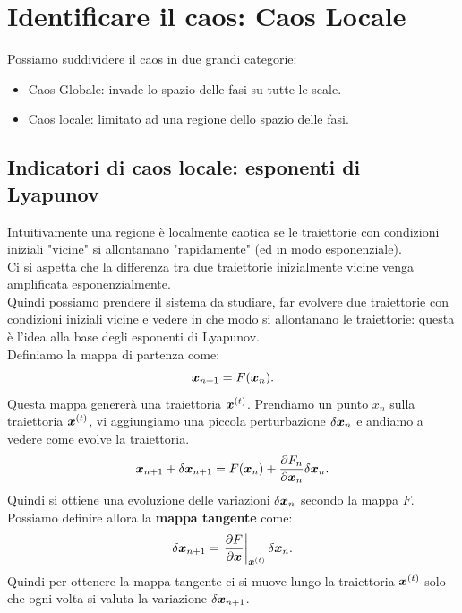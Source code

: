 \section{Identificare il caos: Caos Locale}%
\label{sub:Lezione 20}
\mylocaltoc
Possiamo suddividere il caos in due grandi categorie:
\begin{itemize}
    \item Caos Globale: invade lo spazio delle fasi su tutte le scale.
    \item Caos locale: limitato ad una regione dello spazio delle fasi.
\end{itemize}
\subsection{Indicatori di caos locale: esponenti di Lyapunov}%
\label{sub:Indicatori di caos locale: esponenti di Lyapanov}
Intuitivamente una regione è localmente caotica se le traiettorie con condizioni iniziali "vicine" si allontanano "rapidamente" (ed in modo esponenziale).\\
Ci si aspetta che la differenza tra due traiettorie inizialmente vicine venga amplificata esponenzialmente.\\
Quindi possiamo prendere il sistema da studiare, far evolvere due traiettorie con condizioni iniziali vicine e vedere in che modo si allontanano le traiettorie: questa è l'idea alla base degli esponenti di Lyapunov.\\
Definiamo la mappa di partenza come:
\[
    \boldsymbol{x}_{n+1} = F(\boldsymbol{x}_n)
.\] 
Questa mappa genererà una traiettoria $\boldsymbol{x}^{(t)}$. Prendiamo un punto $x_n$ sulla traiettoria $\boldsymbol{x}^{(t)}$, vi aggiungiamo una piccola perturbazione $\delta\boldsymbol{x}_n$ e andiamo a vedere come evolve la traiettoria.
\[
    \boldsymbol{x}_{n+1} + \delta\boldsymbol{x}_{n+1} = F(\boldsymbol{x}_n) + \frac{\partial F_n}{\partial \boldsymbol{x}_n}  \delta\boldsymbol{x}_n
.\] 
Quindi si ottiene una evoluzione delle variazioni $\delta\boldsymbol{x}_n$ secondo la mappa $F$. Possiamo definire allora la \textbf{mappa tangente} come:
\[
    \delta\boldsymbol{x}_{n+1} = \left.\frac{\partial F}{\partial \boldsymbol{x}} \right|_{\boldsymbol{x}^{(t)}}\delta\boldsymbol{x}_n
.\] 
Quindi per ottenere la mappa tangente ci si muove lungo la traiettoria $\boldsymbol{x}^{(t)}$  solo che ogni volta si valuta la variazione $\delta\boldsymbol{x}_{n+1}$.
